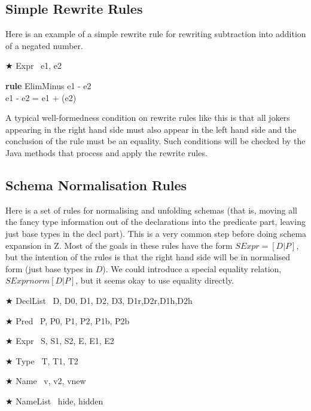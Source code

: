 \documentclass{article}
\newenvironment{zedrule}[1]{\par\textbf{rule }#1\vspace{-2ex}\infrule}{\endinfrule}
\newcommand{\derives}{\derive{}}
\newenvironment{zedjoker}[1]{\par$\bigstar$ #1\ }{}
\newcommand{\HasType}{\mathbin{:}} %
\newcommand{\negate}{\mathop{-}}
\newcommand{\arithmos}{{A\!\!\!\!A}}   %
\newcommand{\proviso}{\raisebox{0.5ex}{${}_{\blacktriangleright}\ $}}%
\begin{document}
\subsection{Simple Rewrite Rules}

Here is an example of a simple rewrite rule
for rewriting subtraction into addition of a negated number.
\begin{zedjoker}{Expr} e1, e2 \end{zedjoker} \\
\begin{zedrule}{ElimMinus}
  \proviso e1 - e2 \HasType \arithmos \\
\derives
  e1 - e2 = e1 + (\negate e2)
\end{zedrule}

A typical well-formedness condition on rewrite rules like this
is that all jokers appearing in the right hand side must also
appear in the left hand side and the conclusion of the rule
must be an equality.  Such conditions will be checked by the
Java methods that process and apply the rewrite rules.


\subsection{Schema Normalisation Rules}

Here is a set of rules for normalising and unfolding schemas
(that is, moving all the fancy type information out of the
declarations into the predicate part, leaving just base types
in the decl part).   This is a very common step before doing
schema expansion in Z.  Most of the goals in these rules
have the form $SExpr = [D|P]$, but the intention of the rules
is that the right hand side will be in normalised form
(just base types in $D$).  We could introduce a special
equality relation, $SExpr \mathrel{norm} [D|P]$, but it seems
okay to use equality directly.

\begin{zedjoker}{DeclList} D, D0, D1, D2, D3, D1r,D2r,D1h,D2h\end{zedjoker} \\
\begin{zedjoker}{Pred} P, P0, P1, P2, P1b, P2b \end{zedjoker} \\
\begin{zedjoker}{Expr} S, S1, S2, E, E1, E2 \end{zedjoker} \\
\begin{zedjoker}{Type} T, T1, T2 \end{zedjoker} \\
\begin{zedjoker}{Name} v, v2, vnew \end{zedjoker} \\
\begin{zedjoker}{NameList} hide, hidden \end{zedjoker} \\
\end{document}
